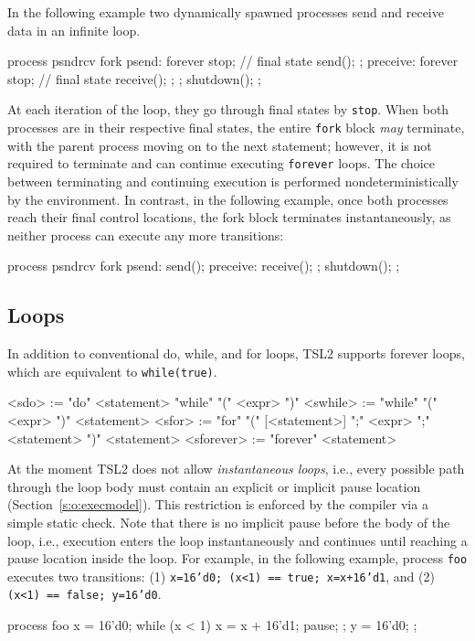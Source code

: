 \documentclass{report}
\newcommand{\src}[1]{\texttt{#1}}
\newcommand{\tsl}{TSL2 }
\begin{document}
In the following example two dynamically spawned processes send 
and receive data in an infinite loop.
\begin{tsllisting}{}
process psndrcv {
  fork {
    psend:    forever {
                  stop;   // final state
                  send();
              };
    preceive: forever {
                  stop;   // final state
                  receive();
              };
  };
  shutdown();
};
\end{tsllisting}
At each iteration of the loop, they go through final states by 
\src{stop}.  When both processes are in their respective final 
states, the entire \src{fork} block \emph{may} terminate, with the 
parent process moving on to the next statement; however, it is not 
required to terminate and can continue executing \src{forever} 
loops.  The choice between terminating and continuing execution is 
performed nondeterministically by the environment.  In contrast, 
in the following example, once both processes reach their final 
control locations, the fork block terminates instantaneously, as 
neither process can execute any more transitions:
\begin{tsllisting}{}
process psndrcv {
  fork {
    psend:    send();
    preceive: receive();
  };
  shutdown();
};
\end{tsllisting}

\subsection{Loops}  

In addition to conventional do, while, and for loops, \tsl 
supports forever loops, which are equivalent to \src{while(true)}.
\begin{bnflisting}{}
<sdo>      := "do" <statement> "while" "(" <expr> ")"
<swhile>   := "while" "(" <expr> ")" <statement>
<sfor>     := "for" "(" [<statement>] ";" 
                        <expr> ";" 
                        <statement> ")" 
                  <statement>
<sforever> := "forever" <statement>
\end{bnflisting}

At the moment \tsl does not allow \emph{instantaneous loops}, 
i.e., every possible path through the loop body must contain an 
explicit or implicit pause location (Section~\ref{s:o:execmodel}).  
This restriction is enforced by the compiler via a simple static 
check.  Note that there is no implicit pause before the body of the 
loop, i.e., execution enters the loop instantaneously and 
continues until reaching a pause location inside the loop.  For 
example, in the following example, process \src{foo} executes two 
transitions: (1) \src{x=16'd0; (x<1) == true; x=x+16'd1}, and 
(2) \src{(x<1) == false; y=16'd0}.
\begin{tsllisting}{}
process foo {
    x = 16'd0;
    while (x < 1) {
        x = x + 16'd1;
        pause;
    };
    y = 16'd0;
};
\end{tsllisting}
\end{document}
